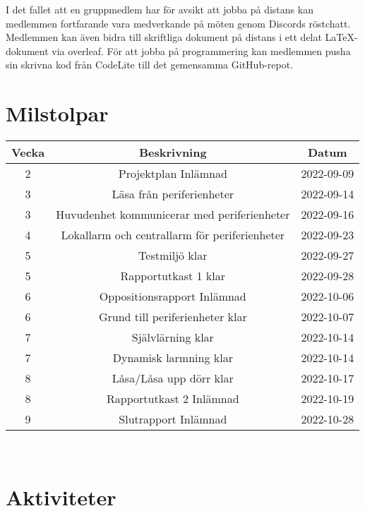 \documentclass[a4paper]{article}
\begin{document}
I det fallet att en gruppmedlem har för avsikt att jobba på distans kan medlemmen fortfarande vara medverkande på möten genom Discords röstchatt. Medlemmen kan även bidra till skriftliga dokument på distans i ett delat LaTeX-dokument via overleaf. För att jobba på programmering kan medlemmen pusha sin skrivna kod från CodeLite till det gemensamma GitHub-repot.


\section{Milstolpar}
\begin{center}
     \begin{tabular}{|c|c|c|}
      \hline
      Vecka & Beskrivning & Datum \\
      \hline
      2 & Projektplan Inlämnad & 2022-09-09 \\
      \rowcolor{lightgray}
      3 & Läsa från periferienheter & 2022-09-14 \\
      3 & Huvudenhet kommunicerar med periferienheter & 2022-09-16 \\
      \rowcolor{lightgray}
      4 & Lokallarm och centrallarm för periferienheter & 2022-09-23 \\
      5 & Testmiljö klar & 2022-09-27 \\
      \rowcolor{lightgray}
      5 & Rapportutkast 1 klar & 2022-09-28 \\
      6 & Oppositionsrapport Inlämnad & 2022-10-06 \\
      \rowcolor{lightgray}
      6 & Grund till periferienheter klar & 2022-10-07 \\ 
      7 & Självlärning klar & 2022-10-14 \\
      \rowcolor{lightgray}
      7 & Dynamisk larmning klar & 2022-10-14 \\
      8 & Låsa/Låsa upp dörr klar & 2022-10-17 \\
      \rowcolor{lightgray}
      8 & Rapportutkast 2 Inlämnad & 2022-10-19 \\
      9 & Slutrapport Inlämnad & 2022-10-28 \\
      \hline
     \end{tabular}
 \end{center}
\
\

\section{Aktiviteter} %
\end{document}
